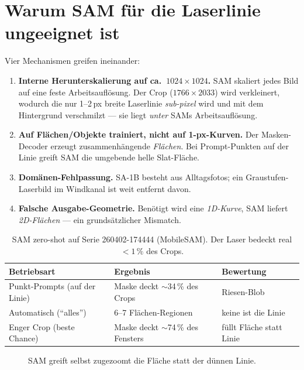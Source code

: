 \documentclass[11pt,a4paper]{article}
\begin{document}
\section{Warum SAM für die Laserlinie ungeeignet ist}
\label{sec:warum}
Vier Mechanismen greifen ineinander:
\begin{enumerate}
  \item \textbf{Interne Herunterskalierung auf ca.\ $1024\times1024$.} SAM skaliert
        jedes Bild auf eine feste Arbeitsauflösung. Der Crop ($1766\times2033$) wird
        verkleinert, wodurch die nur \mbox{1--2\,px} breite Laserlinie
        \emph{sub-pixel} wird und mit dem Hintergrund verschmilzt --- sie liegt
        \emph{unter} SAMs Arbeitsauflösung.
  \item \textbf{Auf Flächen/Objekte trainiert, nicht auf 1-px-Kurven.} Der
        Masken-Decoder erzeugt zusammenhängende \emph{Flächen}. Bei Prompt-Punkten
        auf der Linie greift SAM die umgebende helle Slat-Fläche.
  \item \textbf{Domänen-Fehlpassung.} SA-1B besteht aus Alltagsfotos; ein
        Graustufen-Laserbild im Windkanal ist weit entfernt davon.
  \item \textbf{Falsche Ausgabe-Geometrie.} Benötigt wird eine \emph{1D-Kurve},
        SAM liefert \emph{2D-Flächen} --- ein grundsätzlicher Mismatch.
\end{enumerate}

\begin{table}[h]
  \centering
  \caption{SAM zero-shot auf Serie 260402-174444 (MobileSAM). Der Laser bedeckt
  real $<1\,\%$ des Crops.}
  \label{tab:sam}
  \begin{tabular}{lll}
    \toprule
    \textbf{Betriebsart} & \textbf{Ergebnis} & \textbf{Bewertung}\\
    \midrule
    Punkt-Prompts (auf der Linie) & Maske deckt $\sim$34\,\% des Crops & Riesen-Blob \\
    Automatisch (``alles'')       & 6--7 Flächen-Regionen            & keine ist die Linie \\
    Enger Crop (beste Chance)     & Maske deckt $\sim$74\,\% des Fensters & füllt Fläche statt Linie \\
    \bottomrule
  \end{tabular}
\end{table}

\begin{figure}[h]
  \centering
  \caption{SAM greift selbst zugezoomt die Fläche statt der dünnen Linie.}
  \label{fig:engcrop}
\end{figure}
\end{document}

